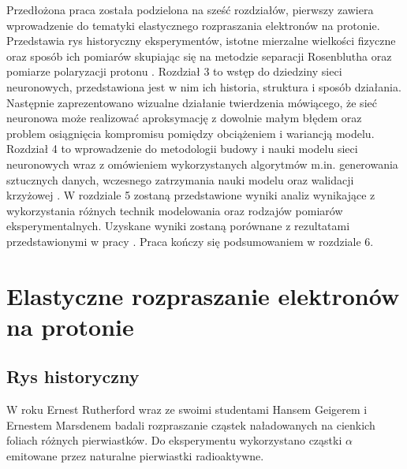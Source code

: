 \documentclass[11pt]{book}
\theoremstyle{definition}
\begin{document}
Przedłożona praca została podzielona na sześć rozdziałów, pierwszy zawiera wprowadzenie do tematyki elastycznego rozpraszania elektronów na protonie. Przedstawia rys historyczny eksperymentów, istotne mierzalne wielkości fizyczne oraz sposób ich pomiarów skupiając się na metodzie separacji Rosenblutha \cite{PhysRev.79.615} oraz pomiarze polaryzacji protonu \cite{Akhiezer:1974em}. Rozdział 3 to wstęp do dziedziny sieci neuronowych, przedstawiona jest w nim ich historia, struktura i sposób działania. Następnie zaprezentowano wizualne działanie twierdzenia mówiącego, że sieć neuronowa może realizować aproksymację z dowolnie małym błędem oraz problem osiągnięcia kompromisu pomiędzy obciążeniem i wariancją modelu. Rozdział 4 to wprowadzenie do metodologii budowy i nauki modelu sieci neuronowych wraz z omówieniem wykorzystanych algorytmów m.in. generowania sztucznych danych, wczesnego zatrzymania nauki modelu oraz walidacji krzyżowej . W rozdziale 5 zostaną przedstawione wyniki analiz wynikające z wykorzystania różnych technik modelowania oraz rodzajów pomiarów eksperymentalnych. Uzyskane wyniki zostaną porównane z rezultatami przedstawionymi w pracy \cite{PhysRevC.84.034314}. Praca kończy się podsumowaniem w rozdziale 6.

\chapter{Elastyczne rozpraszanie elektronów na protonie}
\section{Rys historyczny}

W roku Ernest Rutherford wraz ze swoimi studentami Hansem Geigerem i Ernestem Marsdenem badali rozpraszanie cząstek naładowanych na cienkich foliach różnych pierwiastków. Do eksperymentu wykorzystano cząstki $\alpha$ emitowane przez naturalne pierwiastki radioaktywne. 
\end{document}
